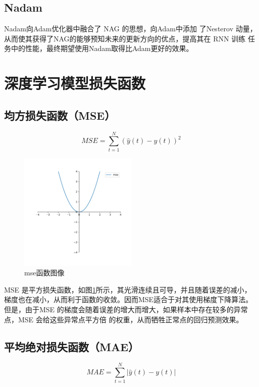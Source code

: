 \documentclass[AutoFakeBold]{LZUThesis}
\begin{document}
\subsection{Nadam}
Nadam\cite{dozat2016incorporating}向Adam优化器中融合了 NAG 的思想，向Adam中添加
了Nesterov 动量，从而使其获得了NAG的能够预知未来的更新方向的优点，提高其在 RNN 训练
任务中的性能，最终期望使用Nadam取得比Adam更好的效果。

\section{深度学习模型损失函数}
\subsection{均方损失函数（MSE）}
$$MSE=\sum_{t=1}^{N}\left(\hat{y}\left(t\right)-y\left(t\right)\right)^2$$

\begin{figure}[H]
	\centering
    \includegraphics[width=0.5\textwidth]{figures/mse.pdf}
    \caption{mse函数图像}
    \label{fig_mse}
\end{figure}

MSE 是平方损失函数，如图\ref{fig_mse}所示，其光滑连续且可导，并且随着误差的减小，
梯度也在减小，从而利于函数的收敛。因而MSE适合于对其使用梯度下降算法。但是，由于MSE
的梯度会随着误差的增大而增大，如果样本中存在较多的异常点，MSE 会给这些异常点平方倍
的权重，从而牺牲正常点的回归预测效果。

\subsection{平均绝对损失函数（MAE）}
$$MAE=\sum_{t=1}^{N}\left|\hat{y}\left(t\right)-y\left(t\right)\right|$$
\end{document}
